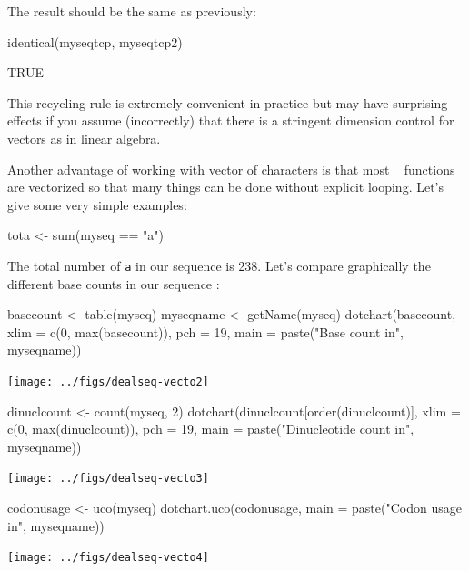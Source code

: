\documentclass{article}
\begin{document}
\begin{enumerate}
The result should be the same as previously:

\begin{Schunk}
\begin{Sinput}
 identical(myseqtcp, myseqtcp2)
\end{Sinput}
\begin{Soutput}
[1] TRUE
\end{Soutput}
\end{Schunk}

This recycling rule is extremely convenient in practice but may have surprising
effects if you assume (incorrectly) that there is a stringent dimension control for \Rlogo{}~ vectors
as in linear algebra.

\end{enumerate}

Another advantage of working with vector of characters is that most \Rlogo{}~ functions
are vectorized so that many things can be done without explicit looping. Let's
give some very simple examples:

\begin{Schunk}
\begin{Sinput}
 tota <- sum(myseq == "a")
\end{Sinput}
\end{Schunk}

The total number of \texttt{a} in our sequence is 238. Let's compare
graphically the different base counts in our sequence :

\begin{Schunk}
\begin{Sinput}
 basecount <- table(myseq)
 myseqname <- getName(myseq)
 dotchart(basecount, xlim = c(0, max(basecount)), pch = 19, 
     main = paste("Base count in", myseqname))
\end{Sinput}
\end{Schunk}
\texttt{[image: ../figs/dealseq-vecto2]}

\begin{Schunk}
\begin{Sinput}
 dinuclcount <- count(myseq, 2)
 dotchart(dinuclcount[order(dinuclcount)], xlim = c(0, max(dinuclcount)), 
     pch = 19, main = paste("Dinucleotide count in", myseqname))
\end{Sinput}
\end{Schunk}
\texttt{[image: ../figs/dealseq-vecto3]}

\begin{Schunk}
\begin{Sinput}
 codonusage <- uco(myseq)
 dotchart.uco(codonusage, main = paste("Codon usage in", myseqname))
\end{Sinput}
\end{Schunk}
\texttt{[image: ../figs/dealseq-vecto4]}
\end{document}
